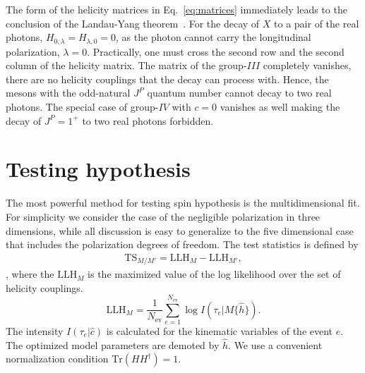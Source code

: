 \documentclass[prd,preprintnumbers,floatfix,
nofootinbib,superscriptaddress]{revtex4}
\newcommand{\diff}{\mathrm{d}}
\newcommand{\TS}{\mathrm{TS}}
\newcommand{\LLH}{\mathrm{LLH}}
\newcommand{\III}{\ensuremath{{I\!I\!I}}}
\newcommand{\IV}{\ensuremath{{I\!V}}}
\begin{document}
The form of the helicity matrices in Eq.~\eqref{eq:matrices} immediately leads to the
conclusion of the Landau-Yang theorem~\cite{Yang:1950rg,Landau:1948kw}.
For the decay of $X$ to a pair of the real photons,
$H_{0,\lambda} = H_{\lambda,0} = 0$, as the photon cannot carry the longitudinal polarization, $\lambda=0$.
Practically, one must cross the second row and the second column of the helicity matrix.
The matrix of the group-$\III$ completely vanishes, there are no helicity couplings
that the decay can process with. Hence, the mesons with the odd-natural $J^P$ quantum number
cannot decay to two real photons.
The special case of group-$\IV$ with $c=0$ vanishes as well making the decay of $J^P=1^+$ to two real photons forbidden.

%


\section{Testing hypothesis} \label{sec:test.statistics}
The most powerful method for testing spin hypothesis is the multidimensional fit.
For simplicity we consider the case of the negligible polarization in three dimensions, while all discussion is easy to generalize to the five dimensional case that includes
the polarization degrees of freedom.
The test statistics is defined by
\begin{align} \label{eq:test.statistics}
  \TS_{M/M'} = \LLH_M - \LLH_{M'},
\end{align},
where the $\LLH_M$ is the maximized value of the log likelihood over the set of helicity couplings.
\begin{equation} \label{eq:likelihood}
  \LLH_M = \frac{1}{N_\mathrm{ev}} \sum_{e=1}^{N_\mathrm{ev}} \log I(\tau_e|M\{\hat{h}\}).
\end{equation}
The intensity $I(\tau_e|\hat{c})$ is calculated for the kinematic variables of the event $e$.
The optimized model parameters are demoted by $\hat{h}$. We use a convenient normalization condition $\mathrm{Tr}(HH^\dagger) = 1$.
\end{document}
